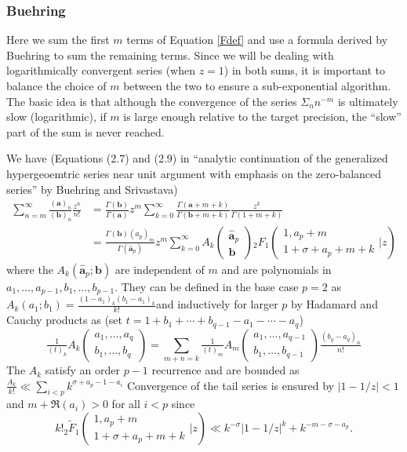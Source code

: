 \documentclass[12pt]{article}
\numberwithin{equation}{section}
\newcommand{\Head}[3] {{}_{#1}{#2}_{#3}}
\newcommand{\ArgS}[3] {( \begin{smallmatrix} #1 \\ #2 \end{smallmatrix} | {#3})}
\newcommand{\ParamS}[2] {( \begin{smallmatrix} #1 \\ #2 \end{smallmatrix})}
\begin{document}
\subsubsection{Buehring}
Here we sum the first $m$ terms of Equation \eqref{Fdef} and use a formula derived by Buehring to sum the remaining terms. Since we will be dealing with logarithmically convergent series (when $z=1$) in both sums, it is important to balance the choice of $m$ between the two to ensure a sub-exponential algorithm. The basic idea is that although the convergence of the series $\Sigma_n n^{-m}$ is ultimately slow (logarithmic), if $m$ is large enough relative to the target precision, the ``slow'' part of the sum is never reached.

We have (Equations (2.7) and (2.9) in ``analytic continuation of the generalized hypergeoemtric series near unit argument with emphasis on the zero-balanced series'' by Buehring and Srivastava)
\begin{align}
\nonumber
\sum_{n=m}^{\infty}{\tfrac{(\mathbf{a})_n}{(\mathbf{b})_n} \tfrac{z^n}{n!}}&=\tfrac{\Gamma(\mathbf{b})}{\Gamma(\mathbf{a})} z^m \sum_{k=0}^{\infty} {\tfrac{\Gamma(\mathbf{a}+m+k)}{\Gamma(\mathbf{b}+m+k)} \tfrac{z^k}{\Gamma(1+m+k)}}\\
\label{buehring}
&=\tfrac{\Gamma(\mathbf{b})(a_p)_m}{\Gamma(\hat{\mathbf{a}}_p)} z^m \sum_{k=0}^{\infty} {A_k \ParamS{\hat{\mathbf{a}}_p}{\mathbf{b}} \Head2F1 \ArgS{1,a_p+m}{1+\sigma+a_p+m+k}{z}}
\end{align}
where the $A_k(\hat{\mathbf{a}}_p; \mathbf{b})$ are independent of $m$ and are polynomials in $a_1,\dots,a_{p-1},b_1,\dots,b_{p-1}$. They can be defined in the base case $p=2$ as $A_k(a_1;b_1) = \frac{(1-a_1)_k(b_1-a_1)_k}{k!}$and inductively for larger $p$ by Hadamard and Cauchy products as (set $t=1+b_1 + \cdots + b_{q-1} - a_1-\cdots -a_q$)
\begin{equation*}
\tfrac{1}{(t)_k}A_k \ParamS{a_1,\dots,a_q}{b_1,\dots,b_q} = \sum_{m+n=k} \tfrac{1}{(t)_m} A_m \ParamS{a_1,\dots,a_{q-1}}{b_1,\dots,b_{q-1}} \tfrac{(b_q-a_q)_n}{n!}
\end{equation*}
The $A_k$ satisfy an order $p-1$ recurrence and are bounded as $\frac{A_k}{k!} \ll \sum_{i<p}k^{\sigma+a_p-1-a_i}$ Convergence of the tail series is ensured by
$|1-1/z|<1$ and $m+\Re(a_i)>0$ for all $i<p$ since
\begin{equation*}
k! \Head{2}{\tilde{F}}{1} \ArgS{1,a_p+m}{1+\sigma+a_p+m+k}{z} \ll k^{-\sigma} \left|1-1/z\right|^k + k^{-m-\sigma-a_p}\text{.}
\end{equation*}
\end{document}
